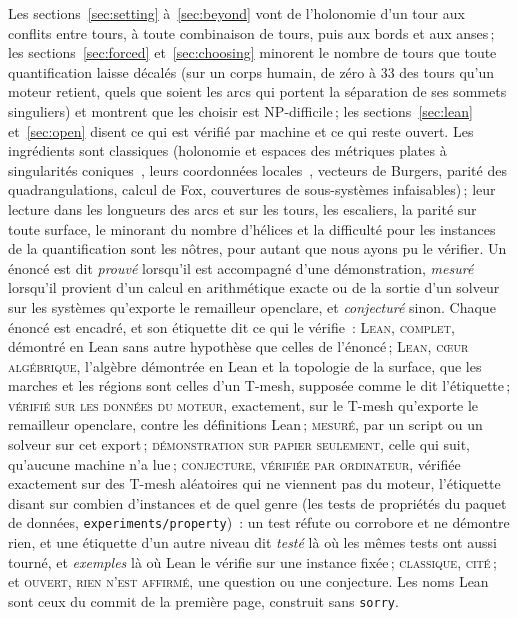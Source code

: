 \documentclass[11pt,a4paper]{article}
\begin{document}
Les sections~\ref{sec:setting} à~\ref{sec:beyond} vont de l'holonomie d'un
tour aux conflits entre tours, à toute combinaison de tours, puis aux bords et
aux anses\,; les sections~\ref{sec:forced} et~\ref{sec:choosing} minorent le
nombre de tours que toute quantification laisse décalés (sur un corps humain,
de zéro à 33 des tours qu'un moteur retient, quels que soient les arcs qui
portent la séparation de ses sommets singuliers) et montrent que les
choisir est NP-difficile\,; les sections~\ref{sec:lean} et~\ref{sec:open}
disent ce qui est vérifié par machine et ce qui reste ouvert. Les ingrédients
sont classiques (holonomie et espaces des métriques plates à
singularités coniques~\cite{veech1993flat}, leurs coordonnées
locales~\cite{thurston1998shapes}, vecteurs de
Burgers, parité des quadrangulations, calcul de Fox, couvertures de
sous-systèmes infaisables)\,; leur lecture dans les longueurs des arcs et sur
les tours, les escaliers, la parité sur toute surface, le minorant du nombre
d'hélices et la difficulté pour les instances de la quantification sont les
nôtres, pour autant que nous ayons pu le vérifier. \ifdefined\plain
Un énoncé est dit
\emph{prouvé} lorsqu'il est accompagné d'une démonstration, \emph{mesuré}
lorsqu'il provient d'un calcul en arithmétique exacte ou de la sortie d'un
solveur sur les systèmes qu'exporte le remailleur openclare, et
\emph{conjecturé} sinon.
\else
Chaque énoncé est encadré, et son étiquette dit ce qui le vérifie~:
\textsc{Lean, complet}, démontré en Lean sans autre hypothèse que celles de
l'énoncé\,; \textsc{Lean, cœur algébrique}, l'algèbre démontrée en Lean et la
topologie de la surface, que les marches et les régions sont celles d'un
T-mesh, supposée comme le dit l'étiquette\,; \textsc{vérifié sur les données
du moteur}, exactement, sur le T-mesh qu'exporte le remailleur openclare,
contre les définitions Lean\,; \textsc{mesuré}, par un script ou un solveur
sur cet export\,; \textsc{démonstration sur papier seulement}, celle qui
suit, qu'aucune machine n'a lue\,; \textsc{conjecture, vérifiée par
ordinateur}, vérifiée exactement sur des T-mesh aléatoires qui ne viennent
pas du moteur, l'étiquette disant sur combien d'instances et de quel genre
(les tests de propriétés du paquet de données,
\texttt{experiments/property})~: un test réfute ou corrobore et ne démontre
rien, et une étiquette d'un autre niveau dit \emph{testé} là où les mêmes
tests ont aussi tourné, et \emph{exemples} là où Lean le vérifie sur une
instance fixée\,; \textsc{classique, cité}\,; et
\textsc{ouvert, rien n'est affirmé}, une question ou une conjecture. Les noms
Lean sont ceux du commit de la première page, construit sans
\texttt{sorry}.
\fi
\end{document}
